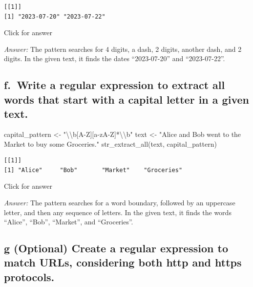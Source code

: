 \documentclass[
]{book}
\newenvironment{Shaded}{\begin{snugshade}}{\end{snugshade}}
\newcommand{\FunctionTok}[1]{\textcolor[rgb]{0.00,0.00,0.00}{#1}}
\newcommand{\NormalTok}[1]{#1}
\newcommand{\OtherTok}[1]{\textcolor[rgb]{0.56,0.35,0.01}{#1}}
\newcommand{\SpecialCharTok}[1]{\textcolor[rgb]{0.00,0.00,0.00}{#1}}
\newcommand{\StringTok}[1]{\textcolor[rgb]{0.31,0.60,0.02}{#1}}
\begin{document}
\begin{verbatim}
[[1]]
[1] "2023-07-20" "2023-07-22"
\end{verbatim}

Click for answer

\emph{Answer:} The pattern searches for 4 digits, a dash, 2 digits, another dash, and 2 digits. In the given text, it finds the dates ``2023-07-20'' and ``2023-07-22''.

\hypertarget{f.-write-a-regular-expression-to-extract-all-words-that-start-with-a-capital-letter-in-a-given-text.}{%
\subsection{f.~Write a regular expression to extract all words that start with a capital letter in a given text.}\label{f.-write-a-regular-expression-to-extract-all-words-that-start-with-a-capital-letter-in-a-given-text.}}

\begin{Shaded}
\begin{Highlighting}[]
\NormalTok{capital\_pattern }\OtherTok{\textless{}{-}} \StringTok{"}\SpecialCharTok{\textbackslash{}\textbackslash{}}\StringTok{b[A{-}Z][a{-}zA{-}Z]*}\SpecialCharTok{\textbackslash{}\textbackslash{}}\StringTok{b"}
\NormalTok{text }\OtherTok{\textless{}{-}} \StringTok{"Alice and Bob went to the Market to buy some Groceries."}
\FunctionTok{str\_extract\_all}\NormalTok{(text, capital\_pattern)}
\end{Highlighting}
\end{Shaded}

\begin{verbatim}
[[1]]
[1] "Alice"     "Bob"       "Market"    "Groceries"
\end{verbatim}

Click for answer

\emph{Answer:} The pattern searches for a word boundary, followed by an uppercase letter, and then any sequence of letters. In the given text, it finds the words ``Alice'', ``Bob'', ``Market'', and ``Groceries''.

\hypertarget{g-optional-create-a-regular-expression-to-match-urls-considering-both-http-and-https-protocols.}{%
\subsection{g (Optional) Create a regular expression to match URLs, considering both http and https protocols.}\label{g-optional-create-a-regular-expression-to-match-urls-considering-both-http-and-https-protocols.}}
\end{document}
